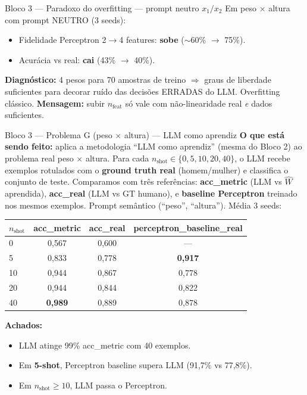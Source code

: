 \documentclass[aspectratio=169,10pt]{beamer}
\begin{document}
\begin{frame}{Bloco 3 --- Paradoxo do overfitting --- prompt neutro $x_1/x_2$}
  \footnotesize
  Em peso $\times$ altura com prompt NEUTRO (3 seeds):
  \begin{itemize}
    \item Fidelidade Perceptron 2$\to$4 features: \textbf{sobe} ($\sim$60\% $\to$ 75\%).
    \item Acur\'acia vs real: \textbf{cai} (43\% $\to$ 40\%).
  \end{itemize}
  \medskip
  \textbf{Diagn\'ostico:} 4 pesos para 70 amostras de treino $\Rightarrow$ graus de liberdade suficientes para decorar ru\'ido das decis\~oes ERRADAS do LLM. Overfitting cl\'assico.
  \medskip
  \textbf{Mensagem:} subir $n_{\text{feat}}$ s\'o vale com n\~ao-linearidade real \emph{e} dados suficientes.
\end{frame}

\begin{frame}{Bloco 3 --- Problema G (peso $\times$ altura) --- LLM como aprendiz}
  \scriptsize
  \textbf{O que est\'a sendo feito:} aplica a metodologia ``LLM como aprendiz'' (mesma do Bloco 2) ao problema real peso $\times$ altura. Para cada $n_{\text{shot}} \in \{0, 5, 10, 20, 40\}$, o LLM recebe exemplos rotulados com o \textbf{ground truth real} (homem/mulher) e classifica o conjunto de teste. Comparamos com tr\^es refer\^encias: \textbf{acc\_metric} (LLM vs $\hat W$ aprendida), \textbf{acc\_real} (LLM vs GT humano), e \textbf{baseline Perceptron} treinado nos mesmos exemplos. Prompt sem\^antico (``peso'', ``altura'').
  \medskip
  M\'edia 3 seeds:
  \begin{center}
  \begin{tabular}{lccc}
    \toprule
    $n_{\text{shot}}$ & acc\_metric & acc\_real & perceptron\_baseline\_real \\
    \midrule
    0  & 0{,}567 & 0{,}600 & --- \\
    5  & 0{,}833 & 0{,}778 & \textbf{0{,}917} \\
    10 & 0{,}944 & 0{,}867 & 0{,}778 \\
    20 & 0{,}944 & 0{,}844 & 0{,}822 \\
    40 & \textbf{0{,}989} & 0{,}889 & 0{,}878 \\
    \bottomrule
  \end{tabular}
  \end{center}
  \textbf{Achados:}
  \begin{itemize}
    \item LLM atinge 99\% acc\_metric com 40 exemplos.
    \item Em \textbf{5-shot}, Perceptron baseline supera LLM (91,7\% vs 77,8\%).
    \item Em $n_{\text{shot}} \geq 10$, LLM passa o Perceptron.
  \end{itemize}
\end{frame}
\end{document}

